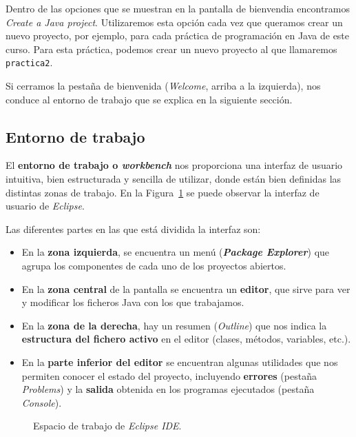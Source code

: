 \documentclass[
  spanish,
  11pt,
  a4paper,
  DIV=11,
  numbers=noendperiod]{scrartcl}
\providecommand{\tightlist}{%
  \setlength{\itemsep}{0pt}\setlength{\parskip}{0pt}}
\begin{document}
Dentro de las opciones que se muestran en la pantalla de bienvendia encontramos \emph{Create a Java project}. Utilizaremos esta opción cada vez que queramos crear un nuevo proyecto, por ejemplo, para cada práctica de programación en Java de este curso. Para esta práctica, podemos crear un nuevo proyecto al que llamaremos \texttt{practica2}.

Si cerramos la pestaña de bienvenida (\emph{Welcome}, arriba a la izquierda), nos conduce al entorno de trabajo que se explica en la siguiente sección.

\subsection{Entorno de trabajo}\label{entorno-de-trabajo}

El \textbf{entorno de trabajo o \emph{workbench}} nos proporciona una interfaz de usuario intuitiva, bien estructurada y sencilla de utilizar, donde están bien definidas las distintas zonas de trabajo. En la Figura~\ref{fig-workbench_eclipse} se puede observar la interfaz de usuario de \emph{Eclipse}.

Las diferentes partes en las que está dividida la interfaz son:

\begin{itemize}
\tightlist
\item
 En la \textbf{zona izquierda}, se encuentra un menú (\textbf{\emph{Package Explorer}}) que agrupa los componentes de cada uno de los proyectos abiertos.
\item
 En la \textbf{zona central} de la pantalla se encuentra un \textbf{editor}, que sirve para ver y modificar los ficheros Java con los que trabajamos.
\item
 En la \textbf{zona de la derecha}, hay un resumen (\emph{Outline}) que nos indica la \textbf{estructura del fichero activo} en el editor (clases, métodos, variables, etc.).
\item
 En la \textbf{parte inferior del editor} se encuentran algunas utilidades que nos permiten conocer el estado del proyecto, incluyendo \textbf{errores} (pestaña \emph{Problems}) y la \textbf{salida} obtenida en los programas ejecutados (pestaña \emph{Console}).
\end{itemize}

\begin{figure}
\caption{Espacio de trabajo de \emph{Eclipse IDE}.}\label{fig-workbench_eclipse}
\end{figure}
\end{document}
